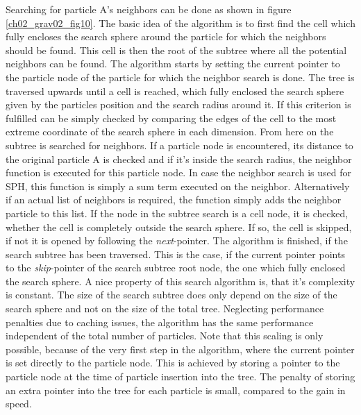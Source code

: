 Searching for particle A's neighbors can be done as shown in figure \ref{ch02_grav02_fig10}. The basic idea of the algorithm is to first find the cell which fully encloses the search sphere around the particle for which the neighbors should be found. This cell is then the root of the subtree where all the potential neighbors can be found. The algorithm starts by setting the current pointer to the particle node of the particle for which the neighbor search is done. The tree is traversed upwards until a cell is reached, which fully enclosed the search sphere given by the particles position and the search radius around it. If this criterion is fulfilled can be simply checked by comparing the edges of the cell to the most extreme coordinate of the search sphere in each dimension. From here on the subtree is searched for neighbors. If a particle node is encountered, its distance to the original particle A is checked and if it's inside the search radius, the neighbor function is executed for this particle node. In case the neighbor search is used for SPH, this function is simply a sum term executed on the neighbor. Alternatively if an actual list of neighbors is required, the function simply adds the neighbor particle to this list. If the node in the subtree search is a cell node, it is checked, whether the cell is completely outside the search sphere. If so, the cell is skipped, if not it is opened by following the \emph{next}-pointer. The algorithm is finished, if the search subtree has been traversed. This is the case, if the current pointer points to the \emph{skip}-pointer of the search subtree root node, the one which fully enclosed the search sphere. A nice property of this search algorithm is, that it's complexity is constant. The size of the search subtree does only depend on the size of the search sphere and not on the size of the total tree. Neglecting performance penalties due to caching issues, the algorithm has the same performance independent of the total number of particles. Note that this scaling is only possible, because of the very first step in the algorithm, where the current pointer is set directly to the particle node. This is achieved by storing a pointer to the particle node at the time of particle insertion into the tree. The penalty of storing an extra pointer into the tree for each particle is small, compared to the gain in speed.

